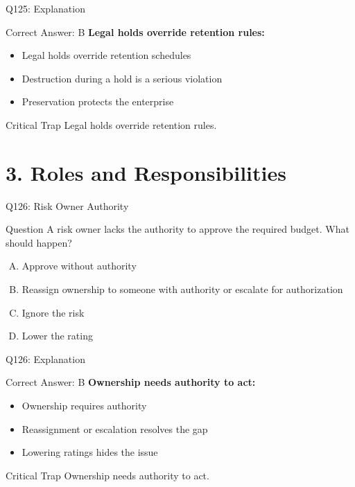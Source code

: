\documentclass{beamer}
\begin{document}
	\begin{frame}{Q125: Explanation}
		\begin{block}{Correct Answer: B}
			\textbf{Legal holds override retention rules:}
			\begin{itemize}
				\item Legal holds override retention schedules
				\item Destruction during a hold is a serious violation
				\item Preservation protects the enterprise
			\end{itemize}
		\end{block}
		\begin{alertblock}{Critical Trap}
			Legal holds override retention rules.
		\end{alertblock}
	\end{frame}
	
	\section{3. Roles and Responsibilities}
	
	\begin{frame}{Q126: Risk Owner Authority}
		\begin{block}{Question}
			A risk owner lacks the authority to approve the required budget. What should happen?
		\end{block}
		\begin{enumerate}[(A)]
			\item Approve without authority
			\item Reassign ownership to someone with authority or escalate for authorization
			\item Ignore the risk
			\item Lower the rating
		\end{enumerate}
	\end{frame}
	
	\begin{frame}{Q126: Explanation}
		\begin{block}{Correct Answer: B}
			\textbf{Ownership needs authority to act:}
			\begin{itemize}
				\item Ownership requires authority
				\item Reassignment or escalation resolves the gap
				\item Lowering ratings hides the issue
			\end{itemize}
		\end{block}
		\begin{alertblock}{Critical Trap}
			Ownership needs authority to act.
		\end{alertblock}
	\end{frame}
	
\end{document}
